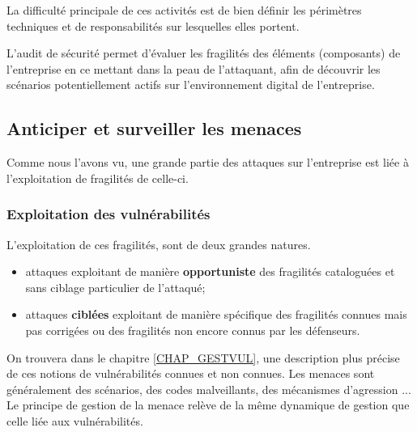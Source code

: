 La difficulté principale de ces activités est de bien définir les périmètres techniques et de responsabilités sur lesquelles elles portent.

L'audit de sécurité permet d'évaluer les fragilités des éléments (composants) de l'entreprise en ce mettant dans la peau de l'attaquant, afin de découvrir les scénarios potentiellement actifs sur l'environnement digital de l'entreprise.

\subsection{Anticiper et surveiller les menaces }

Comme nous l'avons vu, une grande partie des attaques sur l'entreprise est liée à l'exploitation de fragilités de celle-ci. 

\begin{frame}
\frametitle<presentation>{Exploitation des vulnérabilités}
L'exploitation de ces fragilités, sont de deux grandes natures.
\begin{itemize}
	\item attaques exploitant de manière \textbf{opportuniste} des fragilités cataloguées et sans ciblage particulier de l'attaqué;
	\item attaques \textbf{ciblées} exploitant de manière spécifique des fragilités connues mais pas corrigées ou des fragilités non encore connus par les défenseurs.
\end{itemize}
\end{frame}

On trouvera dans le chapitre \ref{CHAP_GESTVUL}, une description plus précise de ces notions de vulnérabilités connues et non connues. Les menaces sont généralement des scénarios, des codes malveillants, des mécanismes d'agression  ...
Le principe de gestion de la menace relève de la même dynamique de gestion que celle liée aux vulnérabilités. 


